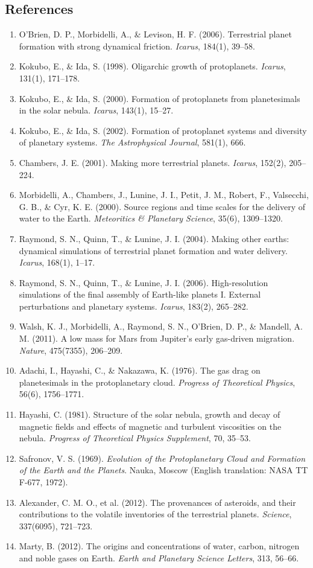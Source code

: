 \documentclass[11pt,a4paper]{article}
\begin{document}
\subsection*{References}
\begin{enumerate}
    \item O'Brien, D. P., Morbidelli, A., \& Levison, H. F. (2006). Terrestrial planet formation with strong dynamical friction. \textit{Icarus}, 184(1), 39--58.
    \item Kokubo, E., \& Ida, S. (1998). Oligarchic growth of protoplanets. \textit{Icarus}, 131(1), 171--178.
    \item Kokubo, E., \& Ida, S. (2000). Formation of protoplanets from planetesimals in the solar nebula. \textit{Icarus}, 143(1), 15--27.
    \item Kokubo, E., \& Ida, S. (2002). Formation of protoplanet systems and diversity of planetary systems. \textit{The Astrophysical Journal}, 581(1), 666.
    \item Chambers, J. E. (2001). Making more terrestrial planets. \textit{Icarus}, 152(2), 205--224.
    \item Morbidelli, A., Chambers, J., Lunine, J. I., Petit, J. M., Robert, F., Valsecchi, G. B., \& Cyr, K. E. (2000). Source regions and time scales for the delivery of water to the Earth. \textit{Meteoritics \& Planetary Science}, 35(6), 1309--1320.
    \item Raymond, S. N., Quinn, T., \& Lunine, J. I. (2004). Making other earths: dynamical simulations of terrestrial planet formation and water delivery. \textit{Icarus}, 168(1), 1--17.
    \item Raymond, S. N., Quinn, T., \& Lunine, J. I. (2006). High-resolution simulations of the final assembly of Earth-like planets I. External perturbations and planetary systems. \textit{Icarus}, 183(2), 265--282.
    \item Walsh, K. J., Morbidelli, A., Raymond, S. N., O'Brien, D. P., \& Mandell, A. M. (2011). A low mass for Mars from Jupiter's early gas-driven migration. \textit{Nature}, 475(7355), 206--209.
    \item Adachi, I., Hayashi, C., \& Nakazawa, K. (1976). The gas drag on planetesimals in the protoplanetary cloud. \textit{Progress of Theoretical Physics}, 56(6), 1756--1771.
    \item Hayashi, C. (1981). Structure of the solar nebula, growth and decay of magnetic fields and effects of magnetic and turbulent viscosities on the nebula. \textit{Progress of Theoretical Physics Supplement}, 70, 35--53.
    \item Safronov, V. S. (1969). \textit{Evolution of the Protoplanetary Cloud and Formation of the Earth and the Planets}. Nauka, Moscow (English translation: NASA TT F-677, 1972).
    \item Alexander, C. M. O., et al. (2012). The provenances of asteroids, and their contributions to the volatile inventories of the terrestrial planets. \textit{Science}, 337(6095), 721--723.
    \item Marty, B. (2012). The origins and concentrations of water, carbon, nitrogen and noble gases on Earth. \textit{Earth and Planetary Science Letters}, 313, 56--66.
\end{enumerate}
\end{document}
